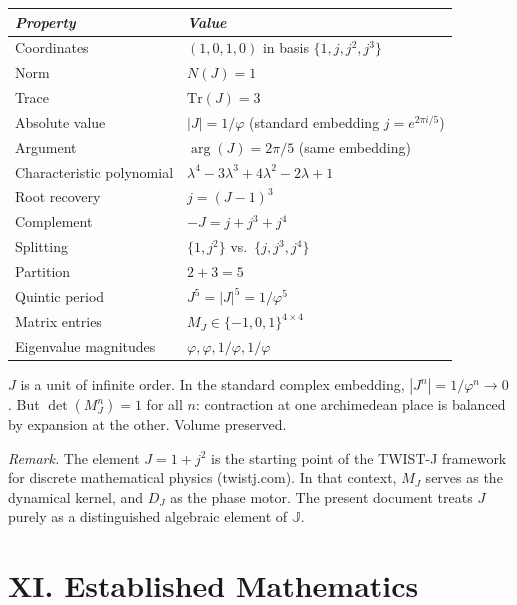 \documentclass[11pt, a4paper]{article}
\newcommand{\ph}{\varphi}
\newcommand{\TT}{\mathbb{J}}
\begin{document}
\renewcommand{\arraystretch}{1.5}
\begin{tabularx}{\textwidth}{LL}
\toprule
\textit{Property} & \textit{Value} \\
\midrule
Coordinates & $(1, 0, 1, 0)$ in basis $\{1, j, j^2, j^3\}$ \\[0.2em]
Norm & $N(J) = 1$ \\[0.2em]
Trace & $\mathrm{Tr}(J) = 3$ \\[0.2em]
Absolute value & $|J| = 1/\ph$ \;(standard embedding $j = e^{2\pi i/5}$) \\[0.2em]
Argument & $\arg(J) = 2\pi/5$ \;(same embedding) \\[0.2em]
Characteristic polynomial & $\lambda^4 - 3\lambda^3 + 4\lambda^2 - 2\lambda + 1$ \\[0.2em]
Root recovery & $j = (J-1)^3$ \\[0.2em]
Complement & $-J = j + j^3 + j^4$ \\[0.2em]
Splitting & $\{1, j^2\}$ vs.\ $\{j, j^3, j^4\}$ \\[0.2em]
Partition & $2 + 3 = 5$ \\[0.2em]
Quintic period & $J^5 = |J|^5 = 1/\ph^5$ \\[0.2em]
Matrix entries & $M_J \in \{-1, 0, 1\}^{4 \times 4}$ \\[0.2em]
Eigenvalue magnitudes & $\ph, \ph, 1/\ph, 1/\ph$ \\
\bottomrule
\end{tabularx}

\vspace{0.5em}

$J$ is a unit of infinite order. In the standard complex embedding, $|J^n| = 1/\ph^n \to 0$. But $\det(M_J^n) = 1$ for all $n$: contraction at one archimedean place is balanced by expansion at the other. Volume preserved.

\vspace{0.3em}

\textit{Remark.} The element $J = 1 + j^2$ is the starting point of the TWIST-J framework for discrete mathematical physics (twistj.com). In that context, $M_J$ serves as the dynamical kernel, and $D_J$ as the phase motor. The present document treats $J$ purely as a distinguished algebraic element of $\TT$.

\section*{XI. Established Mathematics}
\end{document}
